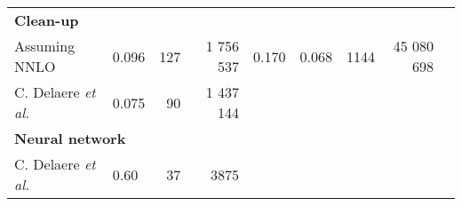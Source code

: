 \documentclass[10pt,a4paper]{article}
\newcommand{\level}[1]{ \multicolumn{5}{l}{\hspace{-1em}\textbf{#1}}}
\newcommand{\T}{\rule{0pt}{2.9ex}}       %
\newcommand{\B}{\rule[-1.3ex]{0pt}{0pt}} %
\newcommand{\sAN}{$\sigma_1$}
\newcommand{\etal}{\emph{et al.}}
\begin{document}
\begin{table}[t]
\begin{tabular}{@{\quad}llrrllrrr@{}}
	\level{Clean-up} \T\\
 	Assuming NNLO          & 0.096 &    127  &   1 756 537 & 0.170 & 0.068 &   1144  &  45 080 698  \\
	C. Delaere \etal       & 0.075 &     90  &   1 437 144 &       &       &         &              \\
	\level{Neural network} \T\\
	C. Delaere \etal       & 0.60  &     37  &        3875 &       &       &         &            \B\\
	\bottomrule
	
	\end{tabular}
\end{table}






\end{document}
